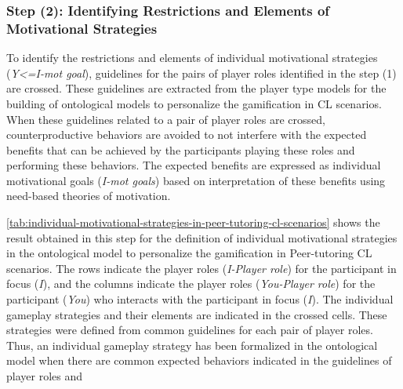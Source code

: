 \subsubsection*{Step (2): Identifying Restrictions and Elements of Motivational Strategies}

To identify the restrictions and elements of individual motivational strategies (\emph{Y<=I-mot goal}), guidelines for the pairs of player roles identified in the step (1) are crossed. These guidelines are extracted from the player type models for the building of ontological models to personalize the gamification in CL scenarios. When these guidelines related to a pair of player roles are crossed, counterproductive behaviors are avoided to not interfere with the expected benefits that can be achieved by the participants playing these roles and performing these behaviors. The expected benefits are expressed as individual motivational goals (\emph{I-mot goals}) based on interpretation of these benefits using need-based theories of motivation. 

\autoref{tab:individual-motivational-strategies-in-peer-tutoring-cl-scenarios} shows the result obtained in this step for the definition of individual motivational strategies in the ontological model to personalize the gamification in Peer-tutoring CL scenarios. The rows indicate the player roles (\emph{I-Player role}) for the participant in focus (\emph{I}), and the columns indicate the player roles (\emph{You-Player role}) for the participant (\emph{You}) who interacts with the participant in focus (\emph{I}). The individual gameplay strategies and their elements are indicated in the crossed cells. These strategies were defined from common guidelines for each pair of player roles. Thus, an individual gameplay strategy has been formalized in the ontological model when there are common expected behaviors indicated in the guidelines of player roles  and 
 

